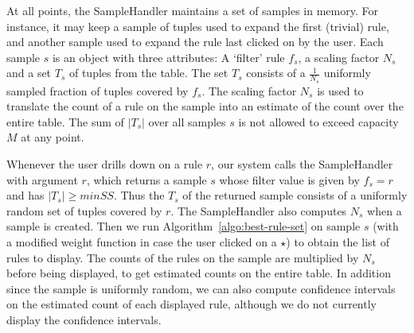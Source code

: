 At all points, the SampleHandler maintains a set of samples in memory. For instance, it may keep a sample of tuples used to expand the first (trivial) rule, and another sample used to expand the rule last clicked on by the user. Each sample $s$ is an object with three attributes: A `filter' rule $f_s$, a scaling factor $N_s$ and a set $T_s$ of tuples from the table. The set $T_s$ consists of a $\frac{1}{N_s}$ uniformly sampled fraction of tuples covered by $f_s$. The scaling factor $N_s$ is used to translate the count of a rule on the sample into an estimate of the count over the entire table. The sum of $|T_s|$ over all samples $s$ is not allowed to exceed capacity $M$ at any point. 

Whenever the user drills down on a rule $r$, our system calls the SampleHandler with argument $r$, which returns a sample $s$ whose filter value is given by $f_s = r$ and has $|T_s| \geq minSS$. Thus the $T_s$ of the returned sample consists of a uniformly random set of tuples covered by $r$. The SampleHandler also computes $N_s$ when a sample is created. Then we run Algorithm~\ref{algo:best-rule-set} on sample $s$ (with a modified weight function in case the user clicked on a $\star$) to obtain the list of rules to display. The counts of the rules on the sample are multiplied by $N_s$ before being displayed, to get estimated counts on the entire table. In addition since the sample is uniformly random, we can also compute confidence intervals on the estimated count of each displayed rule, although we do not currently display the confidence intervals.

